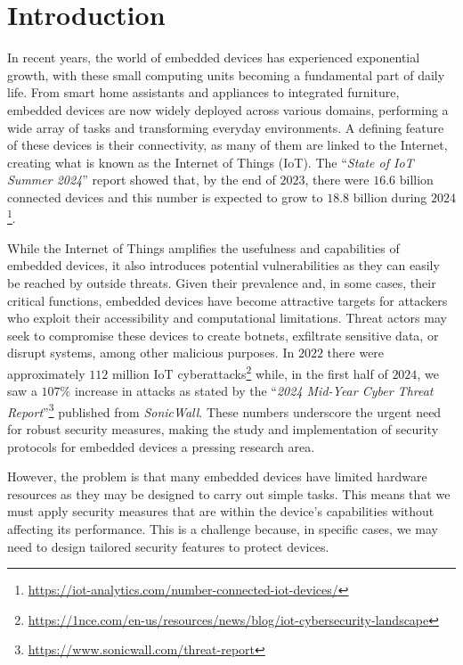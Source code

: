 \chapter{Introduction}
\label{cha:introduction}

In recent years, the world of embedded devices has experienced exponential growth,
with these small computing units becoming a fundamental part of daily life. From
smart home assistants and appliances to integrated furniture, embedded devices
are now widely deployed across various domains, performing a wide array of tasks
and transforming everyday environments. A defining feature of these devices is
their connectivity, as many of them are linked to the Internet, creating what is
known as the Internet of Things (IoT). The ``\textit{State of IoT Summer 2024}''
report showed that, by the end of $2023$, there were $16.6$ billion connected
devices and this number is expected to grow to $18.8$ billion during $2024$\footnote{\url{https://iot-analytics.com/number-connected-iot-devices/}}.

While the Internet of Things amplifies the usefulness and capabilities of embedded
devices, it also introduces potential vulnerabilities as they can easily be
reached by outside threats. Given their prevalence and, in some cases, their critical
functions, embedded devices have become attractive targets for attackers who
exploit their accessibility and computational limitations. Threat actors may seek
to compromise these devices to create botnets, exfiltrate sensitive data, or disrupt
systems, among other malicious purposes. In $2022$ there were approximately $112$
million IoT cyberattacks\footnote{\url{https://1nce.com/en-us/resources/news/blog/iot-cybersecurity-landscape}}
while, in the first half of $2024$, we saw a $107\%$ increase in attacks as
stated by the ``\textit{2024 Mid-Year Cyber Threat Report}''\footnote{\url{https://www.sonicwall.com/threat-report}}
published from \textit{SonicWall}. These numbers underscore the urgent need for
robust security measures, making the study and implementation of security protocols
for embedded devices a pressing research area.

However, the problem is that many embedded devices have limited hardware
resources as they may be designed to carry out simple tasks. This means that we must
apply security measures that are within the device's capabilities without affecting
its performance. This is a challenge because, in specific cases, we may need to
design tailored security features to protect devices.

